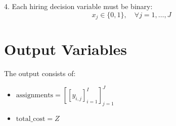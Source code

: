 \documentclass{article}
\begin{document}
4. Each hiring decision variable must be binary:
\[
x_j \in \{0, 1\}, \quad \forall j = 1, \ldots, J
\]

\section*{Output Variables}
The output consists of:
\begin{itemize}
    \item \( \text{assignments} = \left[ \left[y_{i,j}\right]_{i=1}^{I} \right]_{j=1}^{J} \)
    \item \( \text{total\_cost} = Z \)
\end{itemize}
\end{document}
